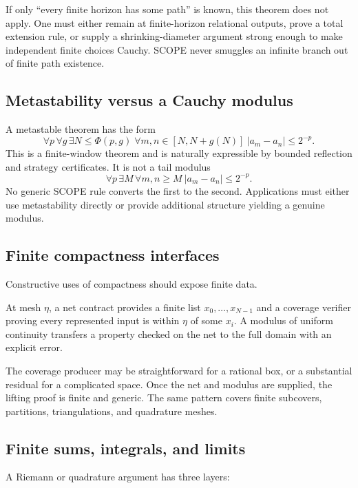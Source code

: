If only ``every finite horizon has some path'' is known, this theorem does not apply.  One must either remain at finite-horizon relational outputs, prove a total extension rule, or supply a shrinking-diameter argument strong enough to make independent finite choices Cauchy.  SCOPE never smuggles an infinite branch out of finite path existence.

\subsection{Metastability versus a Cauchy modulus}

A metastable theorem has the form
\[
  \forall p\,\forall g\,\exists N\le\Phi(p,g)\;
  \forall m,n\in[N,N+g(N)]\ |a_m-a_n|\le2^{-p}.
\]
This is a finite-window theorem and is naturally expressible by bounded reflection and strategy certificates.  It is not a tail modulus
\[
  \forall p\,\exists M\,\forall m,n\ge M\ |a_m-a_n|\le2^{-p}.
\]
No generic SCOPE rule converts the first to the second.  Applications must either use metastability directly or provide additional structure yielding a genuine modulus.

\subsection{Finite compactness interfaces}

Constructive uses of compactness should expose finite data.

\begin{definition}
At mesh \(\eta\), a net contract provides a finite list \(x_0,\ldots,x_{N-1}\) and a coverage verifier proving every represented input is within \(\eta\) of some \(x_i\).  A modulus of uniform continuity transfers a property checked on the net to the full domain with an explicit error.
\end{definition}

The coverage producer may be straightforward for a rational box, or a substantial residual for a complicated space.  Once the net and modulus are supplied, the lifting proof is finite and generic.  The same pattern covers finite subcovers, partitions, triangulations, and quadrature meshes.

\subsection{Finite sums, integrals, and limits}

A Riemann or quadrature argument has three layers:

